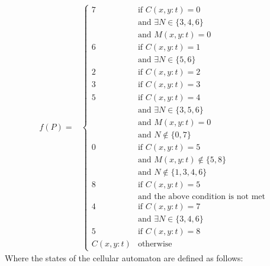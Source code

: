 \documentclass[conference]{IEEEtran}
\begin{document}
    \begin{equation*}
        \begin{aligned}
        f(P) = & \begin{cases}
            7 & \text{if } C(x,y:t) = 0 \\
              & \text{and } \exists N \in \{3, 4, 6\} \\
              & \text{and } M(x,y:t) = 0 \\
            6 & \text{if } C(x,y:t) = 1 \\
              & \text{and } \exists N \in \{5, 6\} \\
            2 & \text{if } C(x,y:t) = 2 \\
            3 & \text{if } C(x,y:t) = 3 \\
            5 & \text{if } C(x,y:t) = 4 \\
              & \text{and } \exists N \in \{3, 5, 6\} \\
              & \text{and } M(x,y:t) = 0 \\
              & \text{and } N \not\in \{0, 7\} \\
            0 & \text{if } C(x,y:t) = 5 \\
              & \text{and } M(x,y:t) \not\in \{5, 8\} \\
              & \text{and } N \not\in \{1, 3, 4, 6\} \\
            8 & \text{if } C(x,y:t) = 5 \\
              & \text{and the above condition is not met} \\
            4 & \text{if } C(x,y:t) = 7 \\
              & \text{and } \exists N \in \{3, 4, 6\} \\
            5 & \text{if } C(x,y:t) = 8 \\
            C(x,y:t) & \text{otherwise}
        \end{cases}
        \end{aligned}
    \end{equation*}
    Where the states of the cellular automaton are defined as follows:
    \vskip 0.2cm
\end{document}
